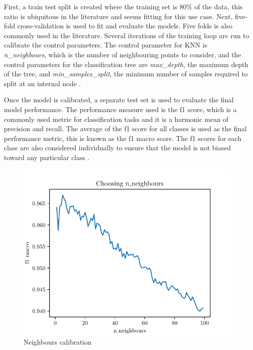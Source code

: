 \documentclass[conference]{IEEEtran}
\begin{document}
First, a train test split is created where the training set is $80\%$ of the data, this ratio is ubiquitous in the literature and seems fitting for this use case.
Next, five-fold cross-validation is used to fit and evaluate the models. Five folds is also commonly used in the literature.
Several iterations of the training loop are run to calibrate the control parameters. The control parameter for KNN is \emph{n\_neighbours}, which is the number of
neighbouring points to consider, and the control parameters for the classification tree are \emph{max\_depth}, the maximum depth of the tree, and \emph{min\_samples\_split},
the minimum number of samples required to split at an internal node \cite{sk}.

Once the model is calibrated, a separate test set is used to evaluate the final model performance. The performance measure used is the f1 score, which is a commonly used
metric for classification tasks and it is a harmonic mean of precision and recall. The average of the f1 score for all classes is used as the final performance metric, this is known as the f1 macro score.
The f1 scores for each class are also considered individually to ensure that the model is not biased toward any particular class \cite{sk}.

\begin{figure}
    \centering
    \includegraphics[scale=0.8]{neigh.pdf}
    \caption{Neighbours calibration}
\end{figure}
\end{document}
